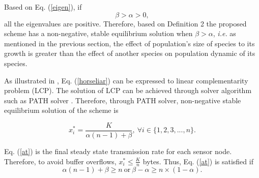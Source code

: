 Based on Eq. (\ref{eigen}), if 
\begin{equation}
\label{ineq1}
\beta > \alpha > 0,
\end{equation}
all the eigenvalues are positive. Therefore, based on Definition 2 the proposed scheme has a non-negative, stable equilibrium solution when $\beta > \alpha$, \textit{i.e.} as mentioned in the previous section, the effect of population's size of species to its growth is greater than the effect of another species on population dynamic of its species.

As illustrated in \cite{lcp}, Eq. (\ref{horseliar}) can be expressed to linear complementarity problem (LCP). The solution of LCP can be achieved through solver algorithm such as PATH solver \cite{Dirkse2013, pathsolver1, Zheng:2013:ZZS:2491411.2491456}. Therefore, through PATH solver, non-negative stable equilibrium solution of the scheme is

\begin{equation}
\label{at}    
x_i^* = \frac{K}{\alpha(n-1)+\beta},~\forall i \in \{1,2,3,...,n\}.
\end{equation}


Eq. (\ref{at}) is the final steady state transmission rate for each sensor node. Therefore, to avoid buffer overflows, $x_i^* \leq \frac{K}{n}$ bytes. Thus, Eq. (\ref{at}) is satisfied if 
\begin{equation}
\label{ineq2}
\alpha(n-1)+\beta \geq n ~\text{or}~\beta - \alpha \geq n \times (1- \alpha).
\end{equation}

